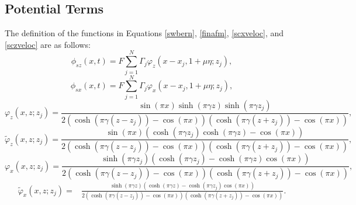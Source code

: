 \documentclass[a4paper,11pt]{article}
\begin{document}
\subsection{Potential Terms \label{poterms}}
The definition of the functions in Equations \eqref{swbern}, \eqref{finafm}, \eqref{scxveloc}, and \eqref{sczveloc}  are as follows:
\[
\phi_{sz}(x,t) =  F\sum_{j=1}^{N} \Gamma_{j}\varphi_{z}(x-x_{j},1+\mu \eta;z_{j}),
\]
\[
\phi_{sx}(x,t) = F\sum_{j=1}^{N}\Gamma_{j}\varphi_{x}(x-x_{j},1+\mu \eta;z_{j}),
\]
\[
\varphi_{z}(x,z;z_{j}) = \frac{\sin(\pi x)\sinh(\pi \gamma z)\sinh(\pi \gamma z_{j})}{2\left(\cosh(\pi\gamma(z-z_{j}))-\cos(\pi x)\right) \left(\cosh(\pi\gamma(z+z_{j}))-\cos(\pi x)\right)},
\]
\[
\tilde{\varphi}_{z}(x,z;z_{j}) = \frac{\sin(\pi x)\left(\cosh(\pi \gamma z_{j})\cosh(\pi \gamma z)-\cos(\pi x)\right)}{2\left(\cosh(\pi\gamma(z-z_{j}))-\cos(\pi x)\right) \left(\cosh(\pi\gamma(z+z_{j}))-\cos(\pi x)\right)},
\]
\[
\varphi_{x}(x,z;z_{j}) = \frac{\sinh(\pi \gamma z_{j})\left(\cosh(\pi \gamma z_{j})-\cosh(\pi \gamma z)\cos(\pi x)\right)}{2\left(\cosh(\pi\gamma(z-z_{j}))-\cos(\pi x)\right) \left(\cosh(\pi\gamma(z+z_{j}))-\cos(\pi x)\right)},
\]
\begin{align*}
\tilde{\varphi}_{x}(x,z;z_{j}) = & \frac{\sinh(\pi \gamma z)(\cosh(\pi\gamma z) -\cosh(\pi \gamma z_{j})\cos(\pi x) )}{2(\cosh(\pi\gamma(z-z_{j}))-\cos(\pi x))(\cosh(\pi\gamma(z+z_{j}))-\cos(\pi x))}.
\end{align*}


\end{document}
